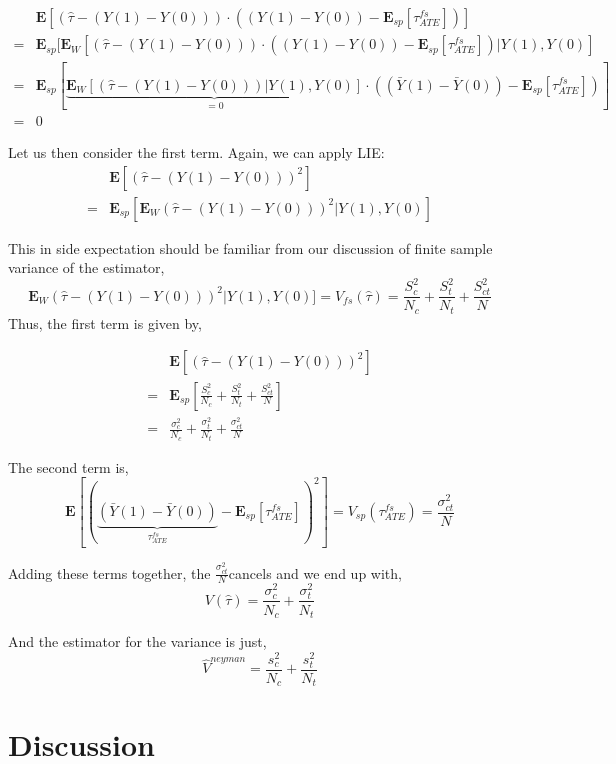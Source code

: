 \documentclass[
  letterpaper,
  DIV=11,
  numbers=noendperiod]{scrreprt}
\theoremstyle{definition}
\theoremstyle{remark}
\begin{document}
\[
\begin{align}
& \mathbf{E}[(\hat{\tau} - (Y(1) - Y(0))) \cdot ((Y(1) - Y(0)) - \mathbf{E}_{sp}[\tau_{ATE}^{fs}] )] \\
=&\mathbf{E}_{sp}[\mathbf{E}_W[(\hat{\tau} - (Y(1) - Y(0)))\cdot((Y(1) - Y(0)) - \mathbf{E}_{sp}[\tau_{ATE}^{fs}])|Y(1),Y(0)] \\
=& \mathbf{E}_{sp}[\underbrace{\mathbf{E}_W[(\hat{\tau} - (Y(1) - Y(0)))|Y(1),Y(0)]}_{=0}\cdot((\bar{Y}(1) - \bar{Y}(0)) - \mathbf{E}_{sp}[\tau_{ATE}^{fs}])]\\
=& 0
\end{align}
\]

Let us then consider the first term. Again, we can apply LIE: \[
\begin{align}
&\mathbf{E} [ (\hat{\tau} - (Y(1) - Y(0)))^2 ]\\
=& \mathbf{E}_{sp} [\mathbf{E}_W (\hat{\tau} - (Y(1) - Y(0)))^2|Y(1), Y(0)]
\end{align}
\]

This in side expectation should be familiar from our discussion of
finite sample variance of the estimator, \[
\mathbf{E}_W (\hat{\tau} - (Y(1) - Y(0)))^2|Y(1), Y(0)]= V_{fs}(\hat{\tau})=\frac{S_c^2}{N_c}+\frac{S_t^2}{N_t}+\frac{S_{ct}^2}{N}
\] Thus, the first term is given by,

\[
\begin{align}
& \mathbf{E} [ (\hat{\tau} - (Y(1) - Y(0)))^2 ] \\
=& \mathbf{E}_{sp}[\frac{S_c^2}{N_c}+\frac{S_t^2}{N_t}+\frac{S_{ct}^2}{N}] \\
=& \frac{\sigma^2_c}{N_c}+\frac{\sigma^2_t}{N_t} + \frac{\sigma^2_{ct}}{N}
\end{align}
\]

The second term is, \[
\mathbf{E}[(\underbrace{(\bar{Y}(1)-\bar{Y}(0))}_{\tau_{ATE}^{fs}}-\mathbf{E}_{sp}[\tau_{ATE}^{fs}])^2]=V_{sp}(\tau_{ATE}^{fs})=\frac{\sigma^2_{ct}}{N}
\]

Adding these terms together, the \(\frac{\sigma^2_{ct}}{N}\)cancels and
we end up with, \[
V(\hat{\tau})=\frac{\sigma^2_c}{N_c}+\frac{\sigma^2_t}{N_t}
\]

And the estimator for the variance is just, \[
\hat{V}^{neyman}=\frac{s^2_c}{N_c}+\frac{s^2_t}{N_t}
\]

\section{Discussion}\label{discussion-1}
\end{document}
